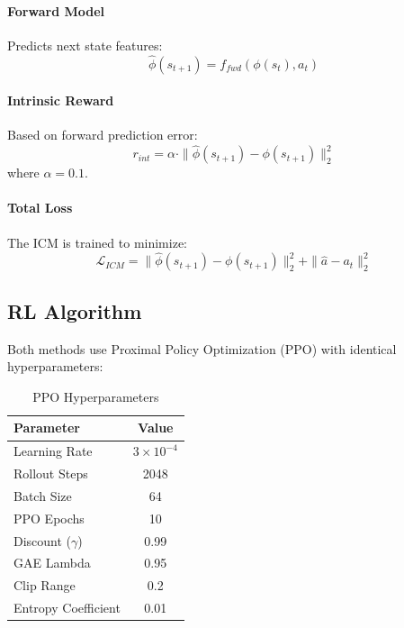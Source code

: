 \documentclass{article}
\begin{document}
\paragraph{Forward Model} Predicts next state features:
\begin{equation}
    \hat{\phi}(s_{t+1}) = f_{fwd}(\phi(s_t), a_t)
\end{equation}

\paragraph{Intrinsic Reward} Based on forward prediction error:
\begin{equation}
    r_{int} = \alpha \cdot \|\hat{\phi}(s_{t+1}) - \phi(s_{t+1})\|_2^2
\end{equation}
where $\alpha = 0.1$.

\paragraph{Total Loss} The ICM is trained to minimize:
\begin{equation}
    \mathcal{L}_{ICM} = \|\hat{\phi}(s_{t+1}) - \phi(s_{t+1})\|_2^2 + \|\hat{a} - a_t\|_2^2
\end{equation}

\subsection{RL Algorithm}

Both methods use Proximal Policy Optimization (PPO) with identical hyperparameters:

\begin{table}[h]
\centering
\caption{PPO Hyperparameters}
\begin{tabular}{lc}
\toprule
Parameter & Value \\
\midrule
Learning Rate & $3 \times 10^{-4}$ \\
Rollout Steps & 2048 \\
Batch Size & 64 \\
PPO Epochs & 10 \\
Discount ($\gamma$) & 0.99 \\
GAE Lambda & 0.95 \\
Clip Range & 0.2 \\
Entropy Coefficient & 0.01 \\
\bottomrule
\end{tabular}
\end{table}
\end{document}
